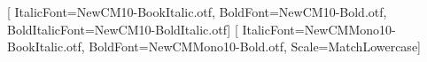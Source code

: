 \usepackage{microtype}
\usepackage{fancyvrb}
\makeatletter
\renewcommand{\verbatim@font}{\ttfamily\small}
\makeatother
\usepackage{fontspec}
\setmainfont{NewCM10-Book.otf}[%
  ItalicFont=NewCM10-BookItalic.otf,
  BoldFont=NewCM10-Bold.otf,
  BoldItalicFont=NewCM10-BoldItalic.otf]
\setmonofont{NewCMMono10-Book.otf}[%
  ItalicFont=NewCMMono10-BookItalic.otf,
  BoldFont=NewCMMono10-Bold.otf,
  Scale=MatchLowercase]
\usepackage{titlesec}
\titleformat{\section}{\normalfont\large\scshape}{\thesection}{1em}{}
\setlength{\emergencystretch}{3em}
